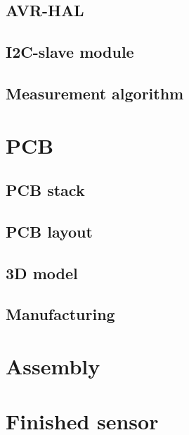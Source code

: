 \subsection{AVR-HAL}
\subsection{I2C-slave module}
\subsection{Measurement algorithm}

\section{PCB}
\subsection{PCB stack}
\subsection{PCB layout}
\subsection{3D model}
\subsection{Manufacturing}

\section{Assembly}

\section{Finished sensor}
